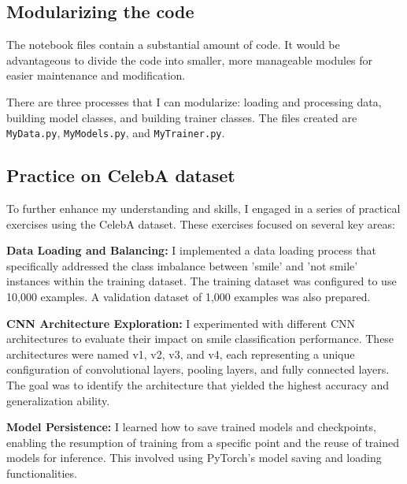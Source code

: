 \subsection{Modularizing the code}
The notebook files contain a substantial amount of code. It would be advantageous to divide the code into smaller, more manageable modules for easier maintenance and modification.

There are three processes that I can modularize: loading and processing data, building model classes, and building trainer classes. The files created are \texttt{MyData.py}, \texttt{MyModels.py}, and \texttt{MyTrainer.py}.

\subsection{Practice on CelebA dataset}
To further enhance my understanding and skills, I engaged in a series of practical exercises using the CelebA dataset. These exercises focused on several key areas:

\textbf{Data Loading and Balancing:} I implemented a data loading process that specifically addressed the class imbalance between 'smile' and 'not smile' instances within the training dataset. The training dataset was configured to use 10,000 examples. A validation dataset of 1,000 examples was also prepared.

\textbf{CNN Architecture Exploration:} I experimented with different CNN architectures to evaluate their impact on smile classification performance. These architectures were named v1, v2, v3, and v4, each representing a unique configuration of convolutional layers, pooling layers, and fully connected layers. The goal was to identify the architecture that yielded the highest accuracy and generalization ability.

\textbf{Model Persistence:} I learned how to save trained models and checkpoints, enabling the resumption of training from a specific point and the reuse of trained models for inference. This involved using PyTorch's model saving and loading functionalities.
